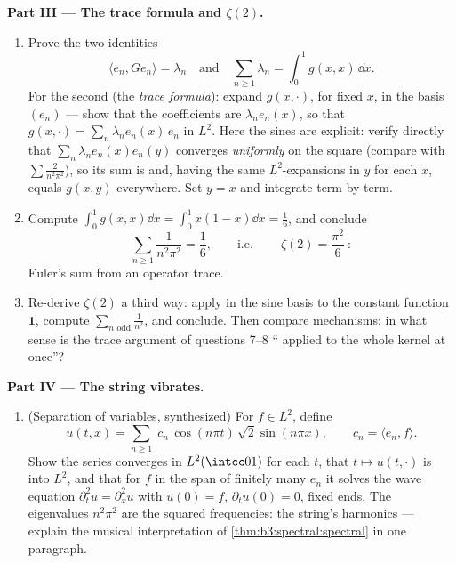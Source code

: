 \begin{problem}
\medskip
\noindent\textbf{Part III --- The trace formula and
$\zeta(2)$.}
\begin{enumerate}[resume]
  \item Prove the two identities
        \[
        \langle e_n, Ge_n\rangle = \lambda_n
        \quad\text{and}\quad
        \sum_{n\geq1}\lambda_n = \int_0^1 g(x,x)\,\dd x .
        \]
        For the second (the \emph{trace formula}): expand
        $g(x, \cdot)$, for fixed $x$, in the basis $(e_n)$ ---
        show that the coefficients are $\lambda_ne_n(x)$, so
        that $g(x, \cdot) = \sum_n\lambda_ne_n(x)\,e_n$ in
        $L^2$. Here the sines are explicit: verify directly
        that $\sum_n\lambda_ne_n(x)e_n(y)$ converges
        \emph{uniformly} on the square (compare with $\sum
        \frac2{n^2\pi^2}$), so its sum is  and, having
        the same $L^2$-expansions in $y$ for each $x$, equals
        $g(x,y)$ everywhere. Set $y = x$ and integrate term by
        term.
  \item Compute $\int_0^1g(x,x)\dd x = \int_0^1x(1-x)\dd x =
        \frac16$, and conclude
        \[
        \sum_{n\geq1}\frac{1}{n^2\pi^2} = \frac16,
        \qquad\text{i.e.}\qquad
        \boxed{\ \zeta(2) = \frac{\pi^2}{6}\ } :
        \]
        Euler's sum from an operator trace.
  \item Re-derive $\zeta(2)$ a third way: apply  in
        the sine basis to the constant function $\mathbf 1$,
        compute $\sum_{n \text{ odd}}\frac1{n^2}$, and
        conclude. Then compare mechanisms: in what sense is
        the trace argument of questions 7--8 ``
        applied to the whole kernel at once''?
\end{enumerate}

\medskip
\noindent\textbf{Part IV --- The string vibrates.}
\begin{enumerate}[resume]
  \item (Separation of variables, synthesized) For $f \in
        L^2$, define
        \[
        u(t, x) = \sum_{n\geq1}\;c_n\,
        \cos(n\pi t)\,\sqrt2\sin(n\pi x),
        \qquad c_n = \langle e_n, f\rangle .
        \]
        Show the series converges in $L^2(\intcc01)$ for each
        $t$, that $t\mapsto u(t, \cdot)$ is  into
        $L^2$, and that for $f$ in the span of finitely many
        $e_n$ it solves the wave equation $\partial_t^2u =
        \partial_x^2u$ with $u(0) = f$, $\partial_tu(0) = 0$,
        fixed ends. The eigenvalues $n^2\pi^2$ are the squared
        frequencies: the string's harmonics --- explain the
        musical interpretation of
        \cref{thm:b3:spectral:spectral} in one paragraph.
\end{enumerate}


\end{problem}
